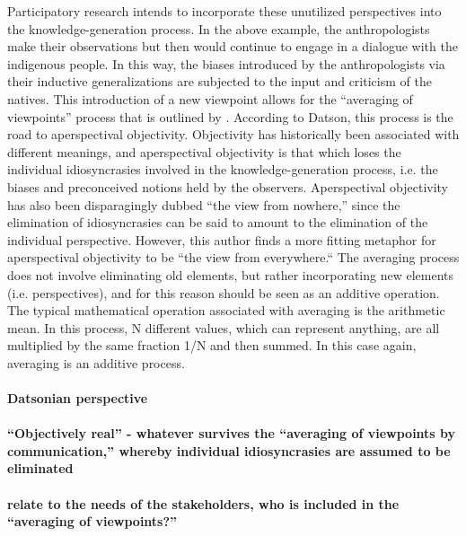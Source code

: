 \documentclass[a4paper]{article}
\begin{document}
Participatory research intends to incorporate these unutilized perspectives
into the knowledge-generation process. In the above example, the
anthropologists make their observations but then would continue to engage in a
dialogue with the indigenous people. In this way, the biases introduced by the
anthropologists via their inductive generalizations are subjected to the input
and criticism of the natives. This introduction of a new viewpoint allows for
the ``averaging of viewpoints'' process that is outlined by
\cite{datson1992objectivity}. According to Datson, this process is the road to
aperspectival objectivity. Objectivity has historically been associated with
different meanings, and aperspectival objectivity is that which
loses the individual idiosyncrasies involved in the knowledge-generation
process, i.e. the biases and preconceived notions held by the observers.
Aperspectival objectivity has also been disparagingly dubbed ``the view from
nowhere,'' since the elimination of idiosyncrasies can be said to amount to
the elimination of the individual perspective. However, this author finds a
more fitting metaphor for aperspectival objectivity to be ``the view from
everywhere.`` The averaging process does not involve eliminating old elements,
but rather incorporating new elements (i.e.  perspectives), and for this
reason should be seen as an additive operation.  The typical mathematical
operation associated with averaging is the arithmetic mean. In this process, N
different values, which can represent anything, are all multiplied by the same
fraction 1/N and then summed. In this case again, averaging is an additive
process.

\paragraph{Datsonian perspective}

\paragraph{``Objectively real'' - whatever survives the ``averaging of viewpoints
by communication,'' whereby individual idiosyncrasies are assumed to be
eliminated}

\paragraph{relate to the needs of the stakeholders, who is included in the
``averaging of viewpoints?''}
\end{document}
